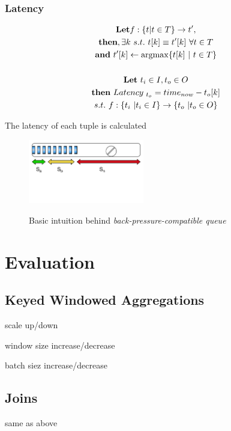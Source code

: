 \documentclass{vldb}
\begin{document}
\subsubsection{Latency}

\begin{equation}
  \begin{gathered}
\textbf{Let} f:\{t| t\in T \} \to t'  , \\
  \textbf{then}, \exists k \ s.t. \ t[k]  \equiv t'[k] \ \forall t \in T\\
  \textbf{and} \ t'[k] \gets \argmax\{t[k] \ | \ t \in T\}  \\
   \\
  \textbf{Let} \ t_{i} \in I , t_{o} \in O \\
\textbf{then} \ Latency_{ \ t_{o}} = time_{now} -  t_{o}[k] \\
s.t. \ f:\{t_{i} \ | t_{i} \in I \} \to \{t_{o} \ | t_{o} \in O \} 
  \end{gathered}\label{eq_1} 
\end{equation}

The latency of each tuple is calculated


\begin{figure}[h]
\caption{Basic intuition behind \textit{back-pressure-compatible queue}}
\centering
\includegraphics[width=0.45\textwidth]{queue}
\label{fig_queue}
\end{figure}


\section{Evaluation}
\subsection{Keyed Windowed Aggregations}
scale up/down

window size increase/decrease

batch siez increase/decrease

\subsection{Joins}
same as above
\end{document}

